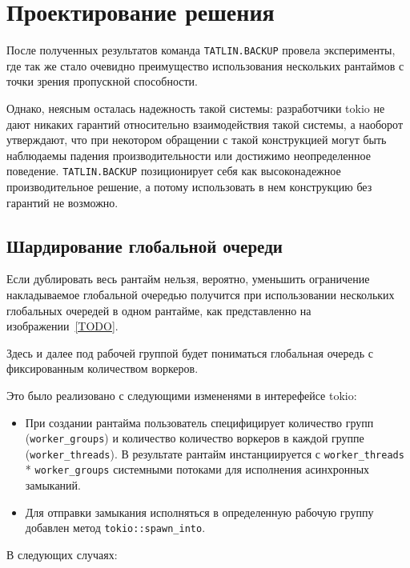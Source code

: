 
\section{Проектирование решения}

После полученных результатов команда \verb|TATLIN.BACKUP| провела эксперименты, где так же стало очевидно преимущество использования нескольких рантаймов с точки зрения пропускной способности.

Однако, неясным осталась надежность такой системы: разработчики tokio не дают никаких гарантий относительно взаимодействия такой системы, а наоборот утверждают, что при некотором обращении с такой конструкцией могут быть наблюдаемы падения производительности или достижимо неопределенное поведение. \verb|TATLIN.BACKUP| позиционирует себя как высоконадежное производительное решение, а потому использовать в нем конструкцию без гарантий не возможно.

\subsection{Шардирование глобальной очереди}

Если дублировать весь рантайм нельзя, вероятно, уменьшить ограничение накладываемое глобальной очередью получится при использовании нескольких глобальных очередей в одном рантайме, как представленно на изображении~\ref{TODO}.


Здесь и далее под рабочей группой будет пониматься глобальная очередь с фиксированным количеством воркеров.

Это было реализовано с следующими измененями в интерефейсе tokio:

\begin{itemize}

\item При создании рантайма пользователь специфицирует количество групп (\verb|worker_groups|) и количество количество воркеров в каждой группе (\verb|worker_threads|). В результате рантайм инстанциируется с \verb|worker_threads| * \verb|worker_groups| системными потоками для исполнения асинхронных замыканий.
\item Для отправки замыкания исполняться в определенную рабочую группу добавлен метод \verb|tokio::spawn_into|.
\end{itemize}

В следующих случаях:

